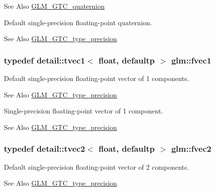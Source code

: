 \begin{DoxySeeAlso}{See Also}
\hyperlink{group__gtc__quaternion}{G\-L\-M\-\_\-\-G\-T\-C\-\_\-quaternion}
\end{DoxySeeAlso}
Default single-\/precision floating-\/point quaternion. \begin{DoxySeeAlso}{See Also}
\hyperlink{group__gtc__type__precision}{G\-L\-M\-\_\-\-G\-T\-C\-\_\-type\-\_\-precision} 
\end{DoxySeeAlso}
\hypertarget{group__gtc__type__precision_gab927d62f22fa57461367011950cec650}{
\subsubsection[{fvec1}]{\setlength{\rightskip}{0pt plus 5cm}typedef detail\-::tvec1$<$ float, defaultp $>$ {\bf glm\-::fvec1}}}\label{group__gtc__type__precision_gab927d62f22fa57461367011950cec650}
Default single-\/precision floating-\/point vector of 1 components. \begin{DoxySeeAlso}{See Also}
\hyperlink{group__gtc__type__precision}{G\-L\-M\-\_\-\-G\-T\-C\-\_\-type\-\_\-precision}
\end{DoxySeeAlso}
Single-\/precision floating-\/point vector of 1 component. \begin{DoxySeeAlso}{See Also}
\hyperlink{group__gtc__type__precision}{G\-L\-M\-\_\-\-G\-T\-C\-\_\-type\-\_\-precision} 
\end{DoxySeeAlso}
\hypertarget{group__gtc__type__precision_gaafd518792a4646c7bb60aabc62a4684c}{
\subsubsection[{fvec2}]{\setlength{\rightskip}{0pt plus 5cm}typedef detail\-::tvec2$<$ float, defaultp $>$ {\bf glm\-::fvec2}}}\label{group__gtc__type__precision_gaafd518792a4646c7bb60aabc62a4684c}
Default single-\/precision floating-\/point vector of 2 components. \begin{DoxySeeAlso}{See Also}
\hyperlink{group__gtc__type__precision}{G\-L\-M\-\_\-\-G\-T\-C\-\_\-type\-\_\-precision}
\end{DoxySeeAlso}
